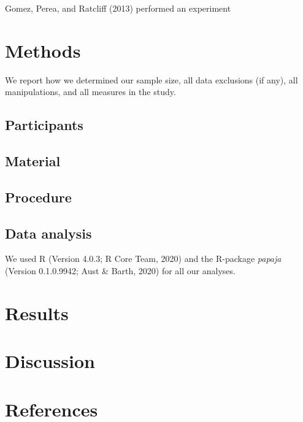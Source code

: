 \documentclass[
  english,
  man]{apa6}
\begin{document}
Gomez, Perea, and Ratcliff (2013) performed an experiment

\hypertarget{methods}{%
\section{Methods}\label{methods}}

We report how we determined our sample size, all data exclusions (if any), all manipulations, and all measures in the study.

\hypertarget{participants}{%
\subsection{Participants}\label{participants}}

\hypertarget{material}{%
\subsection{Material}\label{material}}

\hypertarget{procedure}{%
\subsection{Procedure}\label{procedure}}

\hypertarget{data-analysis}{%
\subsection{Data analysis}\label{data-analysis}}

We used R (Version 4.0.3; R Core Team, 2020) and the R-package \emph{papaja} (Version 0.1.0.9942; Aust \& Barth, 2020) for all our analyses.

\hypertarget{results}{%
\section{Results}\label{results}}

\hypertarget{discussion}{%
\section{Discussion}\label{discussion}}

\newpage

\hypertarget{references}{%
\section{References}\label{references}}
\end{document}
